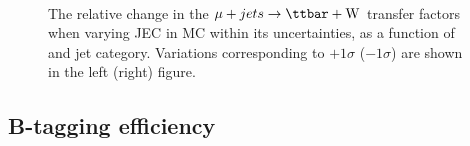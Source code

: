 \begin{figure}[!h]
  \centering
   ~~
  \\

  \caption{\label{fig:tfSyst_jec_muToTtw} The relative change in the
  $\mj \rightarrow \mathrm{\ttbar+W}$ transfer
  factors when varying JEC in MC within its uncertainties, as a function of \scalht and jet category. 
  Variations corresponding to $+1\sigma$ ($-1\sigma$) are shown in the left (right) figure. 
  }
\end{figure}

\clearpage
\subsection{B-tagging efficiency}

